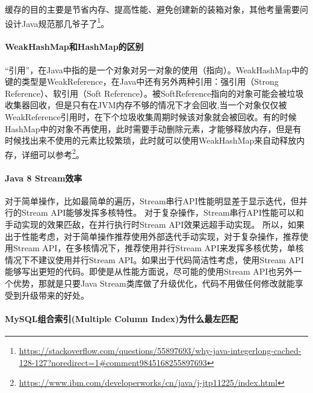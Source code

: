 \documentclass[../../../interview-questions.tex]{subfiles}
\begin{document}
缓存的目的主要是节省内存、提高性能、避免创建新的装箱对象，其他考量需要问设计Java规范那几爷子了\footnote{\url{https://stackoverflow.com/questions/55897693/why-java-integerlong-cached-128-127?noredirect=1\#comment9845168255897693}}。

\paragraph{WeakHashMap和HashMap的区别}

“引用”，在Java中指的是一个对象对另一对象的使用（指向）。WeakHashMap中的键的类型是WeakReference，在Java中还有另外两种引用：强引用（Strong Reference）、软引用（Soft Reference）。被SoftReference指向的对象可能会被垃圾收集器回收，但是只有在JVM内存不够的情况下才会回收,当一个对象仅仅被WeakReference引用时，在下个垃圾收集周期时候该对象就会被回收。有的时候HashMap中的对象不再使用，此时需要手动删除元素，才能够释放内存，但是有时候找出来不使用的元素比较繁琐，此时就可以使用WeakHashMap来自动释放内存，详细可以参考\footnote{\url{https://www.ibm.com/developerworks/cn/java/j-jtp11225/index.html}}。


\paragraph{Java 8 Stream效率}

对于简单操作，比如最简单的遍历，Stream串行API性能明显差于显示迭代，但并行的Stream API能够发挥多核特性。
对于复杂操作，Stream串行API性能可以和手动实现的效果匹敌，在并行执行时Stream API效果远超手动实现。
所以，如果出于性能考虑，对于简单操作推荐使用外部迭代手动实现，对于复杂操作，推荐使用Stream API，在多核情况下，推荐使用并行Stream API来发挥多核优势，单核情况下不建议使用并行Stream API。如果出于代码简洁性考虑，使用Stream API能够写出更短的代码。即使是从性能方面说，尽可能的使用Stream API也另外一个优势，那就是只要Java Stream类库做了升级优化，代码不用做任何修改就能享受到升级带来的好处。

\paragraph{MySQL组合索引(Multiple Column Index)为什么最左匹配}
\end{document}
